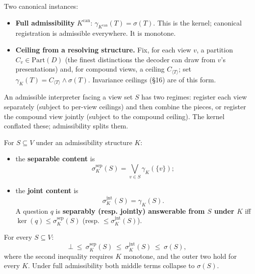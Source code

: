 Two canonical instances:

\begin{itemize}
\tightlist
\item
  \textbf{Full admissibility} \(K^{\mathrm{can}}\): \(\gamma_{K^{\mathrm{can}}}(T)=\sigma(T)\). This is the kernel; canonical registration is admissible everywhere. It is monotone.
\item
  \textbf{Ceiling from a resolving structure.} Fix, for each view \(v\), a partition \(C_v\in\mathrm{Part}(D)\) (the finest distinctions the decoder can draw from \(v\)'s presentations) and, for compound views, a ceiling \(C_{\langle T\rangle}\); set \(\gamma_K(T)=C_{\langle T\rangle}\wedge\sigma(T)\). Invariance ceilings (§16) are of this form.
\end{itemize}


An admissible interpreter facing a view set \(S\) has two regimes: register each view separately (subject to per-view ceilings) and then combine the pieces, or register the compound view jointly (subject to the compound ceiling). The kernel conflated these; admissibility splits them.

\begin{thmdef}

For \(S\subseteq V\) under an admissibility structure \(K\):

\begin{itemize}
\item
  the \textbf{separable content} is
  \[
  \sigma^{\mathrm{sep}}_K(S)=\bigvee_{v\in S}\gamma_K(\{v\});
  \]
\item
  the \textbf{joint content} is
  \[
  \sigma^{\mathrm{jnt}}_K(S)=\gamma_K(S).
  \]
  A question \(q\) is \textbf{separably (resp. jointly) answerable from \(S\) under \(K\)} iff \(\ker(q)\le\sigma^{\mathrm{sep}}_K(S)\) (resp. \(\le\sigma^{\mathrm{jnt}}_K(S)\)).
\end{itemize}
\end{thmdef}

\begin{thmplain}

For every \(S\subseteq V\):
\[
\bot\ \le\ \sigma^{\mathrm{sep}}_K(S)\ \le\ \sigma^{\mathrm{jnt}}_K(S)\ \le\ \sigma(S),
\]
where the second inequality requires \(K\) monotone, and the outer two hold for every \(K\). Under full admissibility both middle terms collapse to \(\sigma(S)\).
\end{thmplain}

